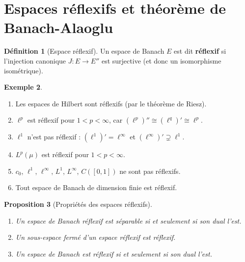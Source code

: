 \documentclass[a4paper,12pt]{book}
\theoremstyle{definition}
\newtheorem{definition}{Définition}[chapter]
\newtheorem{exemple}[definition]{Exemple}
\theoremstyle{plain}
\newtheorem{proposition}[definition]{Proposition}
\theoremstyle{remark}
\begin{document}

\section{Espaces réflexifs et théorème de Banach-Alaoglu}
\label{sec:reflexifs-alaoglu}


\begin{definition}[Espace réflexif]\label{def:reflexif}
Un espace de Banach $E$ est dit \textbf{réflexif} si l'injection canonique
$J : E \to E''$ est surjective (et donc un isomorphisme isométrique).
\end{definition}

\begin{exemple}\label{ex:reflexifs}
\begin{enumerate}[label=(\roman*)]
    \item Les espaces de Hilbert sont réflexifs (par le théorème de Riesz).
    \item $\ell^p$ est réflexif pour $1 < p < \infty$, car
          $(\ell^p)'' \cong (\ell^q)' \cong \ell^p$.
    \item $\ell^1$ n'est pas réflexif : $(\ell^1)' = \ell^\infty$ et
          $(\ell^\infty)' \supsetneq \ell^1$.
    \item $L^p(\mu)$ est réflexif pour $1 < p < \infty$.
    \item $c_0$, $\ell^1$, $\ell^\infty$, $L^1$, $L^\infty$,
          $C([0,1])$ ne sont pas réflexifs.
    \item Tout espace de Banach de dimension finie est réflexif.
\end{enumerate}
\end{exemple}

\begin{proposition}[Propriétés des espaces réflexifs]\label{prop:proprietes-reflexifs}
\begin{enumerate}[label=(\roman*)]
    \item Un espace de Banach réflexif est séparable si et seulement si son dual l'est.
    \item Un sous-espace fermé d'un espace réflexif est réflexif.
    \item Un espace de Banach est réflexif si et seulement si son dual l'est.
\end{enumerate}
\end{proposition}
\end{document}
